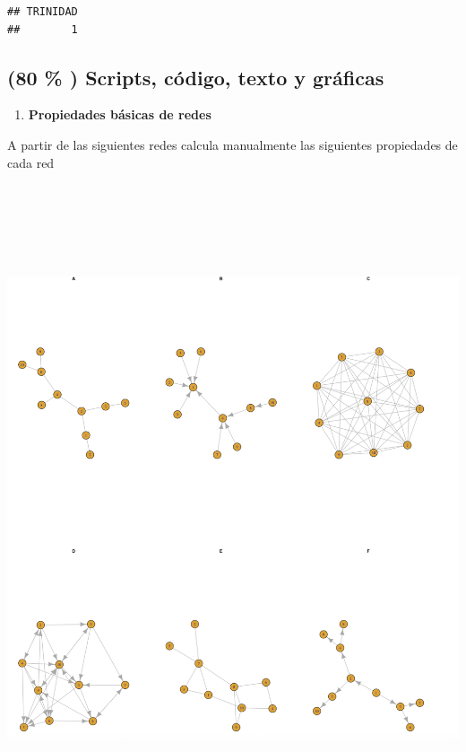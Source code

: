 \documentclass[
]{article}
\providecommand{\tightlist}{%
  \setlength{\itemsep}{0pt}\setlength{\parskip}{0pt}}
\begin{document}
\begin{verbatim}
## TRINIDAD 
##        1
\end{verbatim}

\subsection{(80 \% ) Scripts, código, texto y
gráficas}\label{scripts-cuxf3digo-texto-y-gruxe1ficas}

\begin{enumerate}
\def\labelenumi{\arabic{enumi}.}
\tightlist
\item
  \textbf{Propiedades básicas de redes}
\end{enumerate}

A partir de las siguientes redes calcula manualmente las siguientes
propiedades de cada red
\includegraphics[width=20cm,height=20cm]{Imagenes/Redes.png}
\end{document}
